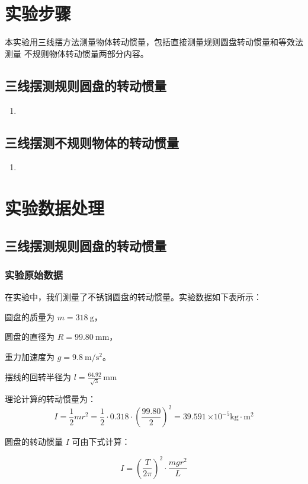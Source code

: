     
\section{实验步骤}
本实验用三线摆方法测量物体转动惯量，包括直接测量规则圆盘转动惯量和等效法测量
不规则物体转动惯量两部分内容。 
\subsection{三线摆测规则圆盘的转动惯量 }

\begin{enumerate}
    \item 
\end{enumerate}

\subsection{三线摆测不规则物体的转动惯量}
\begin{enumerate}
    \item 
\end{enumerate}


\section{实验数据处理}
\subsection{三线摆测规则圆盘的转动惯量}

\subsubsection{实验原始数据}

在实验中，我们测量了不锈钢圆盘的转动惯量。实验数据如下表所示：

圆盘的质量为 $m=318 \mathrm{~g}$，

圆盘的直径为 $R=99.80 \mathrm{~mm}$，

重力加速度为 $g=9.8 \mathrm{~m} / \mathrm{s}^2$。

摆线的回转半径为 $l = \frac{64.92}{\sqrt{3}} \, \mathrm{mm}$

理论计算的转动惯量为：
$$
I=\frac{1}{2} m r^2=\frac{1}{2} \cdot 0.318 \cdot \left(\frac{99.80}{2}\right)^2=39.591 \, \mathrm{\times 10^{-5}kg} \cdot \mathrm{m}^2
$$


圆盘的转动惯量 $I$ 可由下式计算：

$$
I=\left(\frac{T}{2 \pi}\right)^2 \cdot \frac{m g r^2}{L}
$$

